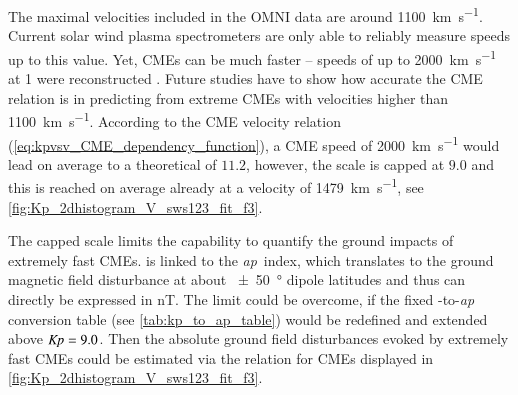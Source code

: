 The maximal velocities included in the OMNI data are around \SI{1100}{\km\per\s}. Current solar wind plasma spectrometers are only able to reliably measure speeds up to this value. Yet, CMEs can be much faster -- speeds of up to \SI{2000}{\km\per\s} at \SI{1}{\au} were reconstructed \citep{Russell2013}. Future studies have to show how accurate the CME relation is in predicting \Kp{} from extreme CMEs with velocities higher than \SI{1100}{\km\per\s}. According to the CME velocity relation (\ref{eq:kpvsv_CME_dependency_function}), a CME speed of \SI{2000}{\km\per\s} would lead on average to a theoretical \Kp{} of $11.2$, however, the \Kp{} scale is capped at $9.0$ and this \Kp{} is reached on average already at a velocity of \SI{1479}{\km\per\s}, see \autoref{fig:Kp_2dhistogram_V_sws123_fit_f3}.
\begin{figure}[htb]
\end{figure}

\pagebreak

The capped \Kp{} scale limits the capability to quantify the ground impacts of extremely fast CMEs. \Kp{} is linked to the \textit{ap}~index, which translates to the ground magnetic field disturbance at about \SI{+-50}{\degree} dipole latitudes and thus can directly be expressed in \si{\nano\tesla}. The limit could be overcome, if the fixed \Kp-to-\textit{ap} conversion table (see \autoref{tab:kp_to_ap_table}) would be redefined and extended above $\text{\textit{Kp}} = 9.0$. Then the absolute ground field disturbances evoked by extremely fast CMEs could be estimated via the \Kp{} relation for CMEs displayed in \autoref{fig:Kp_2dhistogram_V_sws123_fit_f3}.

